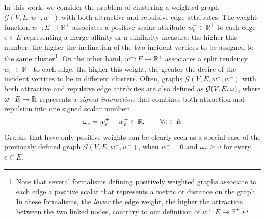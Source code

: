In this work, we consider the problem of clustering a weighted graph $\mathcal{G}(V,E,w^+, w^-)$ with both attractive and repulsive edge attributes. The weight function $w^+: E \rightarrow \mathbb{R}^+$ associates a positive scalar attribute $w_e^+\in \mathbb{R}^+$ to each edge $e \in E$ representing a merge affinity or a similarity measure: the higher this number, the higher the inclination of the two incident vertices to be assigned to the same cluster\footnote{Note that several formalisms defining positively weighted graphs associate to each edge a positive scalar that represents a metric or distance on the graph. In these formalisms, the \emph{lower} the edge weight, the higher the attraction between the two linked nodes, contrary to our definition of $w^+: E \rightarrow \mathbb{R}^+$.}. On the other hand, $w^-: E \rightarrow \mathbb{R}^+$ associates a split tendency $w_e^- \in \mathbb{R}^+$ to each edge: the higher this weight, the greater the desire of the incident vertices to be in different clusters. 
Often, graphs $\mathcal{G}(V,E,w^+, w^-)$ with both attractive and repulsive edge attributes are also defined as $\mathcal{G}(V,E,\omega)$, where $\omega: E \rightarrow \mathbb{R}$ represents a \emph{signed interaction} that combines both attraction and repulsion into one signed scalar number: %
\begin{equation}
\omega_e = w_e^+ - w_e^- \in \mathbb{R}, \quad \quad \forall e \in E
\end{equation}
Graphs that have only positive weights can be clearly seen as a special case of the previously defined graph $\mathcal{G}(V,E,w^+,w^-)$, when $w^-_e=0$ and $\omega_e \geq 0$ for every $e \in E$.

